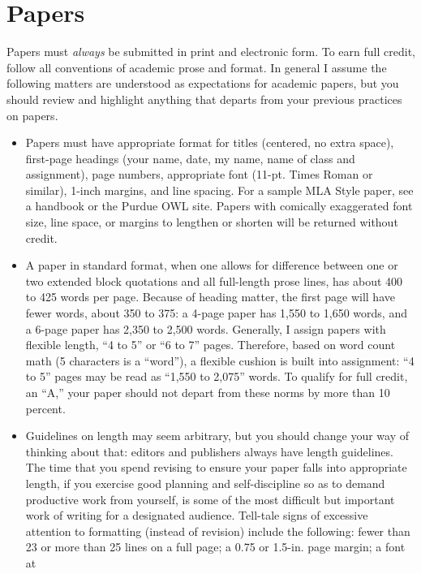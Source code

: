 \documentclass[]{article}
\begin{document}
\section{Papers}\label{papers}

Papers must \emph{always} be submitted in print and electronic form. To
earn full credit, follow all conventions of academic prose and format.
In general I assume the following matters are understood as expectations
for academic papers, but you should review and highlight anything that
departs from your previous practices on papers.

\begin{itemize}
\item
  Papers must have appropriate format for titles (centered, no extra
  space), first-page headings (your name, date, my name, name of class
  and assignment), page numbers, appropriate font (11-pt. Times Roman or
  similar), 1-inch margins, and line spacing. For a sample MLA Style
  paper, see a handbook or the Purdue OWL site. Papers with comically
  exaggerated font size, line space, or margins to lengthen or shorten
  will be returned without credit.
\item
  A paper in standard format, when one allows for difference between one
  or two extended block quotations and all full-length prose lines, has
  about 400 to 425 words per page. Because of heading matter, the first
  page will have fewer words, about 350 to 375: a 4-page paper has 1,550
  to 1,650 words, and a 6-page paper has 2,350 to 2,500 words.
  Generally, I assign papers with flexible length, ``4 to 5'' or ``6 to
  7'' pages. Therefore, based on word count math (5 characters is a
  ``word''), a flexible cushion is built into assignment: ``4 to 5''
  pages may be read as ``1,550 to 2,075'' words. To qualify for full
  credit, an ``A,'' your paper should not depart from these norms by
  more than 10 percent.
\item
  Guidelines on length may seem arbitrary, but you should change your
  way of thinking about that: editors and publishers always have length
  guidelines. The time that you spend revising to ensure your paper
  falls into appropriate length, if you exercise good planning and
  self-discipline so as to demand productive work from yourself, is some
  of the most difficult but important work of writing for a designated
  audience. Tell-tale signs of excessive attention to formatting
  (instead of revision) include the following: fewer than 23 or more
  than 25 lines on a full page; a 0.75 or 1.5-in. page margin; a font at

\end{itemize}
\end{document}
